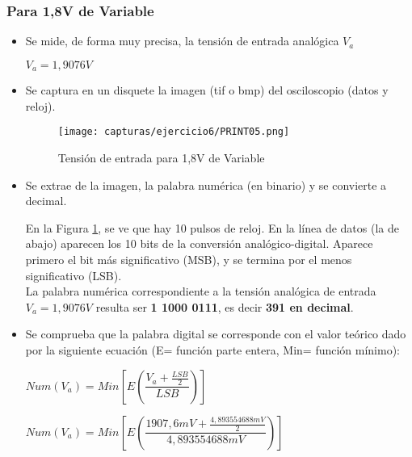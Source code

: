 	\subsubsection{Para 1,8V de Variable}
		\begin{itemize}
			\item Se mide, de forma muy precisa, la tensión de entrada analógica $ V_{a} $
			
			$ V_{a} = 1,9076 V$
			\item Se captura en un disquete la imagen (tif o bmp) del osciloscopio (datos y reloj).
				\begin{figure}[H] %
					\centering
					\texttt{[image: capturas/ejercicio6/PRINT05.png]} 
					\caption{Tensión de entrada para 1,8V de Variable}
					\label{fig:practica6-1}
				\end{figure}
			\item Se extrae de la imagen, la palabra numérica (en binario) y se convierte a decimal.
			
				En la Figura  \ref{fig:practica6-1}, se ve que hay 10 pulsos de reloj. En la línea de datos (la de abajo) aparecen los 10 bits de la conversión
				analógico-digital. Aparece primero el bit más significativo (MSB), y se termina por el menos significativo (LSB).\\
				
				La palabra numérica
				correspondiente a la tensión analógica de entrada $ V_{a} = 1,9076 V$ resulta ser \textbf{1 1000 0111}, es decir \textbf{391 en decimal}.
			
			\item Se comprueba que la palabra digital se corresponde con el valor teórico dado por la siguiente
			ecuación (E= función parte entera, Min= función mínimo):
			
				\begin{center}
					$ Num(V_{a}) = Min [E(\dfrac{V_{a} + \frac{LSB}{2}}{LSB})]$
				\end{center}
			
				$ Num(V_{a}) = Min [E(\dfrac{1907,6mV + \frac{4,893554688mV}{2}}{4,893554688mV})] $ \hspace{3pt} {\fboxrule=1pt \fboxsep=6pt
					}			
		\end{itemize}
	
